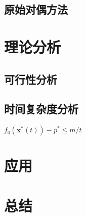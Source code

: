 \documentclass{article}
\begin{document}
\subsection{原始对偶方法}
\label{prim_dual_method}
\section{理论分析}
\subsection{可行性分析}
\subsection{时间复杂度分析}
\label{time_complexity}
$f_0(\bm x^*(t))-p^*\le m/t$
\section{应用}
\section{总结}
\end{document}
